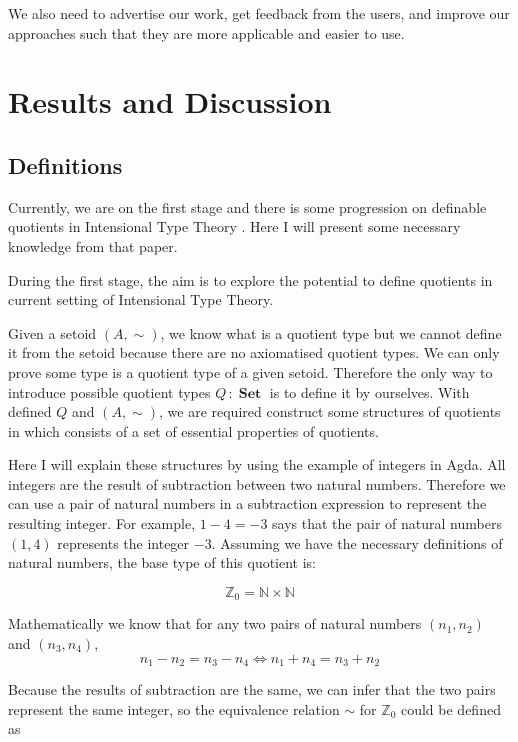 \documentclass{article}
\theoremstyle{definition}
\newcommand{\N}{\mathbb{N}}
\newcommand{\Z}{\mathbb{Z}}
\DeclareMathOperator{\Set}{\mathbf{Set}}
\newcommand{\itt}{Intensional Type Theory}
\begin{document}
We also need to advertise our work, get feedback from the users, and
improve our approaches such that they are more applicable and easier
to use.


\section{Results and Discussion}
\label{sec:rd}

\subsection{Definitions}
\label{sec:definitions}

Currently, we are on the first stage and there is some progression on
definable quotients in \itt{} \cite{aan}. Here I will present some necessary knowledge from that paper.


During the first stage, the aim is to explore the potential to define quotients
in current setting of \itt{}. 


Given a setoid $(A,\sim)$, we know what is a quotient type but we cannot define it from the setoid because there are no axiomatised quotient
types. We can only prove some type is a quotient type of a given
setoid. Therefore the only way to introduce possible quotient types $Q
\,\colon \Set$ is to define it by ourselves. With defined $Q$ and
$(A,\sim)$, we are required construct some structures of quotients in
\cite{aan} which consists of a set of essential properties of quotients.

Here I will explain these structures by using the example of integers
in Agda. All integers are the result of subtraction between two
natural numbers. Therefore we can use a pair of natural numbers in a subtraction
expression to represent the resulting integer.
For example, $1 - 4 = - 3$ says that the pair of natural numbers $(1,4)$
represents the integer $- 3$. Assuming we have the necessary definitions
of natural numbers, the base type of this quotient is:

$$\Z_0=\N \times \N$$

Mathematically we know that for any two pairs of natural numbers $(n_1, n_2)$ and $(n_3, n_4)$, 
$$ n_1 - n_2 = n_3 - n_4\iff n_1 + n_4 = n_3 + n_2$$

Because the results of subtraction are the same, we can infer that the
two pairs represent the same integer, so the equivalence relation
$\sim$ for $\Z_0$ could be defined as
\end{document}
